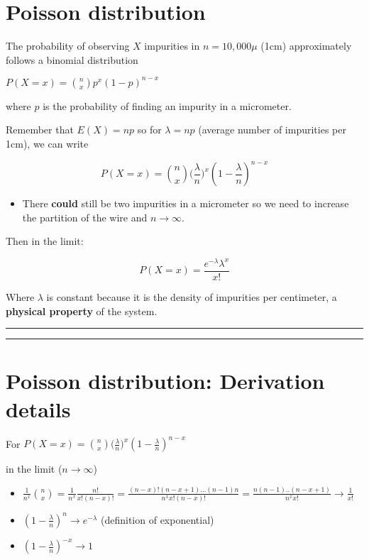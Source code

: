 \documentclass[
]{book}
\providecommand{\tightlist}{%
  \setlength{\itemsep}{0pt}\setlength{\parskip}{0pt}}
\begin{document}
\hypertarget{poisson-distribution-1}{%
\section{Poisson distribution}\label{poisson-distribution-1}}

The probability of observing \(X\) impurities in \(n=10,000\mu\) (1cm) approximately follows a binomial distribution

\(P(X=x)=\binom n x p^x(1-p)^{n-x}\)

where \(p\) is the probability of finding an impurity in a micrometer.

Remember that
\(E(X)=np\)
so for \(\lambda=np\) (average number of impurities per 1cm), we can write

\[P(X=x)=\binom n x \big(\frac{\lambda}{n}\big)^x(1-\frac{\lambda}{n})^{n-x}\]

\begin{itemize}
\tightlist
\item
  There \textbf{could} still be two impurities in a micrometer so we need to increase the partition of the wire and \(n \rightarrow \infty\).
\end{itemize}

Then in the limit:

\[P(X=x)= \frac{e^{-\lambda}\lambda^x}{x!}\]

Where \(\lambda\) is constant because it is the density of impurities per centimeter, a \textbf{physical property} of the system.

\begin{center}\rule{0.5\linewidth}{0.5pt}\end{center}

\begin{center}\rule{0.5\linewidth}{0.5pt}\end{center}

\hypertarget{poisson-distribution-derivation-details}{%
\section{Poisson distribution: Derivation details}\label{poisson-distribution-derivation-details}}

For \(P(X=x)=\binom n x \big(\frac{\lambda}{n}\big)^x(1-\frac{\lambda}{n})^{n-x}\)

in the limit (\(n \rightarrow \infty\))

\begin{itemize}
\tightlist
\item
  \(\frac{1}{n^x}\binom n x =\frac{1}{n^x}\frac{n!}{x! (n-x)!}=\frac{(n-x)!(n-x+1)...(n-1)n}{n^x x! (n-x)!}=\frac{n(n-1)..(n-x+1)}{n^x x!} \rightarrow \frac{1}{x!}\)
\item
  \((1-\frac{\lambda}{n})^{n} \rightarrow e^{-\lambda}\) (definition of exponential)
\item
  \((1-\frac{\lambda}{n})^{-x} \rightarrow 1\)
\end{itemize}
\end{document}
